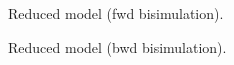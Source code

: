 \documentclass[11pt]{book}
\begin{document}
\begin{figure}[htp]
\centering\begin{minipage}{0.35\linewidth}
\end{minipage}
\caption{Reduced model (fwd bisimulation).}
\end{figure}

\begin{figure}[htp]
\centering\begin{minipage}{0.35\linewidth}
\end{minipage}\caption{Reduced model (bwd bisimulation).}
\end{figure}
\end{document}
